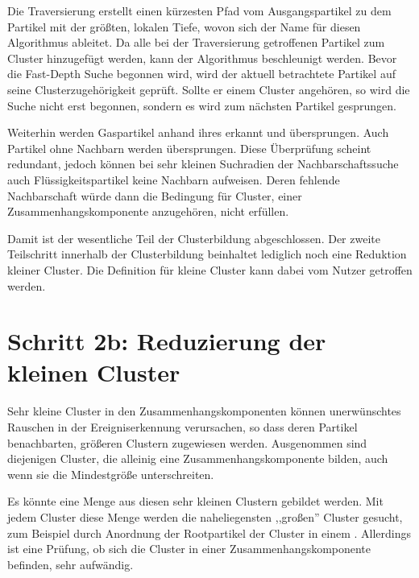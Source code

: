Die Traversierung erstellt einen kürzesten Pfad vom Ausgangspartikel zu dem Partikel mit der größten, lokalen Tiefe, wovon sich der Name für diesen Algorithmus ableitet. Da alle bei der Traversierung getroffenen Partikel zum Cluster hinzugefügt werden, kann der Algorithmus beschleunigt werden. Bevor die Fast-Depth Suche begonnen wird, wird der aktuell betrachtete Partikel auf seine Clusterzugehörigkeit geprüft. Sollte er einem Cluster angehören, so wird die Suche nicht erst begonnen, sondern es wird zum nächsten Partikel gesprungen.

Weiterhin werden Gaspartikel anhand ihres  erkannt und übersprungen. Auch Partikel ohne Nachbarn werden übersprungen. Diese Überprüfung scheint redundant, jedoch können bei sehr kleinen Suchradien der Nachbarschaftssuche auch Flüssigkeitspartikel keine Nachbarn aufweisen. Deren fehlende Nachbarschaft würde dann die Bedingung für Cluster, einer Zusammenhangskomponente anzugehören, nicht erfüllen.

Damit ist der wesentliche Teil der Clusterbildung abgeschlossen. Der zweite Teilschritt innerhalb der Clusterbildung beinhaltet lediglich noch eine Reduktion kleiner Cluster. Die Definition für kleine Cluster kann dabei vom Nutzer getroffen werden.



\section{Schritt 2b: Reduzierung der kleinen Cluster}\label{sec:clusterreduktion}

Sehr kleine Cluster in den Zusammenhangskomponenten können unerwünschtes Rauschen in der Ereigniserkennung verursachen, so dass deren Partikel benachbarten, größeren Clustern zugewiesen werden. Ausgenommen sind diejenigen Cluster, die alleinig eine Zusammenhangskomponente bilden, auch wenn sie die Mindestgröße unterschreiten.

Es könnte eine Menge aus diesen sehr kleinen Clustern gebildet werden. Mit jedem Cluster diese Menge werden die naheliegensten ,,großen'' Cluster gesucht, zum Beispiel durch Anordnung der Rootpartikel der Cluster in einem . Allerdings ist eine Prüfung, ob sich die Cluster in einer Zusammenhangskomponente befinden, sehr aufwändig.

